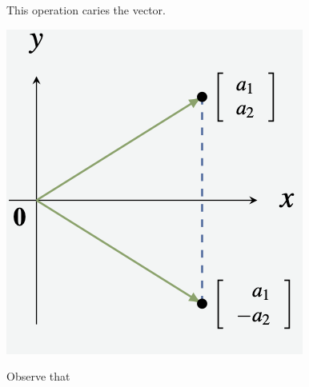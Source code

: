 \documentclass{article}
\begin{document}
\begin{framed}
This operation caries the vector.
%
\begin{center}\includegraphics[scale=0.55]{./figs/Ex2-2-13reflection.png}\end{center}
%
Observe that
\end{framed}
\end{document}
